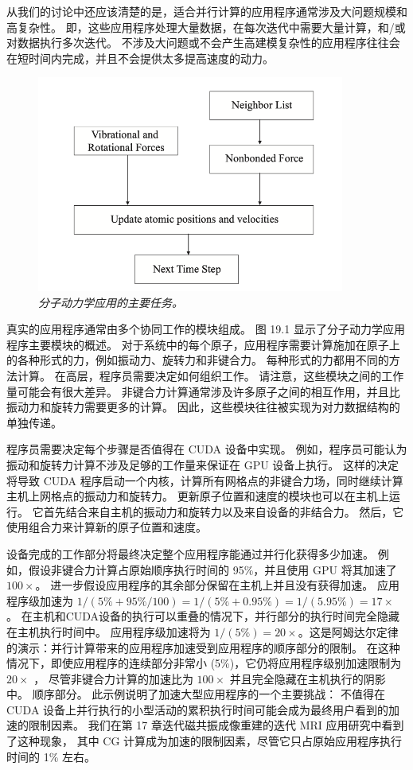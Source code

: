 从我们的讨论中还应该清楚的是，适合并行计算的应用程序通常涉及大问题规模和高复杂性。 
即，这些应用程序处理大量数据，在每次迭代中需要大量计算，和/或对数据执行多次迭代。 
不涉及大问题或不会产生高建模复杂性的应用程序往往会在短时间内完成，并且不会提供太多提高速度的动力。

\begin{figure}[H]
	\centering
	\includegraphics[width=0.9\textwidth]{figs/F19.1.png}
	\caption{\textit{分子动力学应用的主要任务。}}
\end{figure}

真实的应用程序通常由多个协同工作的模块组成。 图 19.1 显示了分子动力学应用程序主要模块的概述。 
对于系统中的每个原子，应用程序需要计算施加在原子上的各种形式的力，例如振动力、旋转力和非键合力。 
每种形式的力都用不同的方法计算。 在高层，程序员需要决定如何组织工作。 请注意，这些模块之间的工作量可能会有很大差异。 
非键合力计算通常涉及许多原子之间的相互作用，并且比振动力和旋转力需要更多的计算。 
因此，这些模块往往被实现为对力数据结构的单独传递。

程序员需要决定每个步骤是否值得在 CUDA 设备中实现。 
例如，程序员可能认为振动和旋转力计算不涉及足够的工作量来保证在 GPU 设备上执行。 
这样的决定将导致 CUDA 程序启动一个内核，计算所有网格点的非键合力场，同时继续计算主机上网格点的振动力和旋转力。 
更新原子位置和速度的模块也可以在主机上运行。 它首先结合来自主机的振动力和旋转力以及来自设备的非结合力。 
然后，它使用组合力来计算新的原子位置和速度。

设备完成的工作部分将最终决定整个应用程序能通过并行化获得多少加速。 
例如，假设非键合力计算占原始顺序执行时间的 95\%，并且使用 GPU 将其加速了 $100\times$。 
进一步假设应用程序的其余部分保留在主机上并且没有获得加速。 
应用程序级加速为 $1/(5\% + 95\%/100) = 1/(5\% + 0.95\%) = 1/(5.95\%) = 17\times$ 。 
在主机和CUDA设备的执行可以重叠的情况下，并行部分的执行时间完全隐藏在主机执行时间中。 
应用程序级加速将为 $1/(5\%) = 20\times$。这是阿姆达尔定律的演示：并行计算带来的应用程序加速受到应用程序的顺序部分的限制。 
在这种情况下，即使应用程序的连续部分非常小 (5\%)，它仍将应用程序级别加速限制为 $20\times$ ，
尽管非键合力计算的加速比为 $100\times $ 并且完全隐藏在主机执行的阴影中。 
顺序部分。 此示例说明了加速大型应用程序的一个主要挑战：
不值得在 CUDA 设备上并行执行的小型活动的累积执行时间可能会成为最终用户看到的加速的限制因素。 
我们在第 17 章迭代磁共振成像重建的迭代 MRI 应用研究中看到了这种现象，
其中 CG 计算成为加速的限制因素，尽管它只占原始应用程序执行时间的 1\% 左右。

